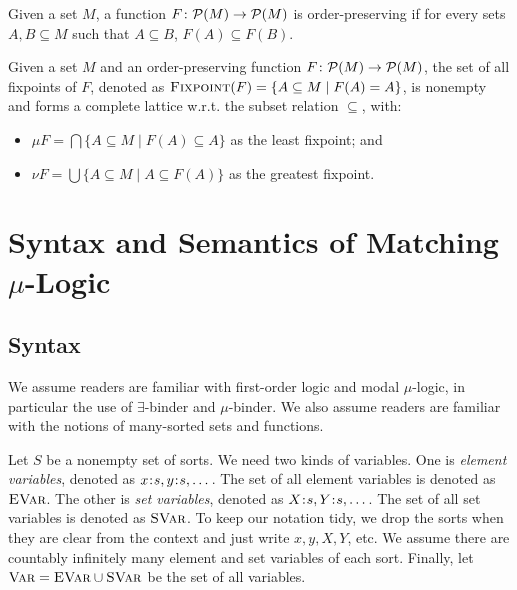 \documentclass{amsart}
\begin{document}
\begin{definition}
Given a set $M$, a function $F \colon \mathcal{P}(M) \to \mathcal{P}(M)$ is order-preserving
if
for every sets $A, B \subseteq M$ such that $A \subseteq B$, 
$F(A) \subseteq F(B)$. 
\end{definition}

\begin{theorem}
Given a set $M$ and an order-preserving function $F \colon \mathcal{P}(M) \to
\mathcal{P}(M)$,
the set of all fixpoints of $F$,
denoted as ${\normalfont\textsc{Fixpoint}}(F) = \{ A \subseteq M \mid F(A) = A \}$,
is nonempty and forms a complete lattice w.r.t. the subset relation $\subseteq$,
with:
\begin{itemize}
\item $\mu F = \bigcap \{ A \subseteq M \mid F(A) \subseteq A \}$
as the least fixpoint; and
\item $\nu F = \bigcup \{ A \subseteq M \mid A \subseteq F(A) \}$
as the greatest fixpoint.
\end{itemize}
\end{theorem}

\begin{theorem}
\end{theorem}



\section{Syntax and Semantics of Matching $\mu$-Logic}

\subsection{Syntax}
\label{sec:MmL_sytax}

We assume readers are familiar with first-order logic
and modal $\mu$-logic, in particular the use of
$\exists$-binder and $\mu$-binder. 
We also assume readers are familiar with the notions
of many-sorted sets and functions.


\begin{notation}[Variables]
\label{not:variables}
Let $S$ be a nonempty set of sorts.
We need two kinds of variables. 
One is \emph{element variables}, denoted as
$x \mathbin{\!:\!} s, y \mathbin{\!:\!} s, \dots$.
The set of all element variables is denoted as ${\normalfont\textsc{EVar}}$.
The other is \emph{set variables}, denoted as
$X \mathbin{\!:\!} s, Y \mathbin{\!:\!} s, \dots$.
The set of all set variables is denoted as ${\normalfont\textsc{SVar}}$.
To keep our notation tidy,
we drop the sorts when they are clear from the context
and just write $x, y, X, Y$, etc.
We assume there are countably infinitely many 
element and set variables of each sort.
Finally, let ${\normalfont\textsc{Var}} = {\normalfont\textsc{EVar}} \cup {\normalfont\textsc{SVar}}$ be the set of all variables.
\end{notation}
\end{document}
